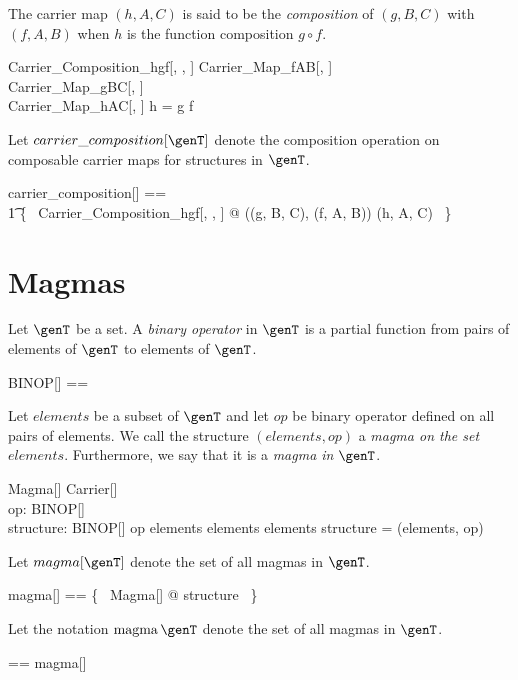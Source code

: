 \documentclass{amsart}
\begin{document}
The carrier map $(h, A, C)$ is said to be the \textit{composition} of $(g, B, C)$ with $(f, A, B)$ when
$h$ is the function composition $g \circ f$.
\begin{schema}{Carrier\_Composition\_hgf}[\genT, \genU, \genV]
	Carrier\_Map\_fAB[\genT, \genU] \\
	Carrier\_Map\_gBC[\genU, \genV] \\
	Carrier\_Map\_hAC[\genT, \genV]
\where
	h = g \circ f
\end{schema}

Let $carrier\_composition[\genT]$ denote the composition operation on composable carrier maps
for structures in $\genT$.
\begin{zed}
	carrier\_composition[\genT] == \\
	\t1	\{~ Carrier\_Composition\_hgf[\genT, \genT, \genT] @ ((g, B, C), (f, A, B)) \mapsto (h, A, C) ~\}
\end{zed}

\section{Magmas}

Let $\genT$ be a set.
A \textit{binary operator} in $\genT$ is a partial function from pairs of elements of $\genT$ to elements of $\genT$.
\begin{zed}
	BINOP[\genT] == \genT \cross \genT \pfun \genT
\end{zed}

Let $elements$ be a subset of $\genT$ and
let $op$ be binary operator defined on all pairs of elements.
We call the structure $(elements, op)$ a \textit{magma on the set} $elements$.
Furthermore, we say that it is a \textit{magma in} $\genT$.
\begin{schema}{Magma}[\genT]
	Carrier[\genT] \\
	op: BINOP[\genT] \\
	structure: \power \genT \cross BINOP[\genT]
\where
	op \in elements \cross elements \fun elements
\also
	structure = (elements, op)
\end{schema}

Let $magma[\genT]$ denote the set of all magmas in $\genT$.
\begin{zed}
	magma[\genT] == \{~ Magma[\genT] @ structure ~\}
\end{zed}

Let the notation $\magma \genT$ denote the set of all magmas in $\genT$.
\begin{zed}
	\magma \genT == magma[\genT]
\end{zed}
\end{document}
